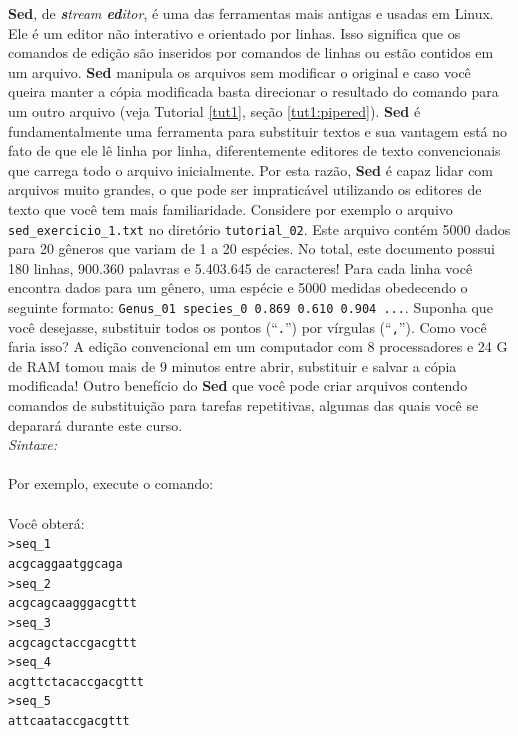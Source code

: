 \begin{refsection}
	\textbf{Sed}, de \textit{\textbf{s}tream \textbf{ed}itor}, é uma das ferramentas mais antigas e usadas em Linux. Ele é um editor não interativo e orientado por linhas. Isso significa que os comandos de edição são inseridos por comandos de linhas ou estão contidos em um arquivo. \textbf{Sed} manipula os arquivos sem modificar o original e caso você queira manter a cópia modificada basta direcionar o resultado do comando para um outro arquivo (veja Tutorial \ref{tut1}, seção \ref{tut1:pipered}). \textbf{Sed} é fundamentalmente uma ferramenta para substituir textos e sua vantagem está no fato de que ele lê linha por linha, diferentemente editores de texto convencionais que carrega todo o arquivo inicialmente. Por esta razão, \textbf{Sed} é capaz lidar com arquivos muito grandes, o que pode ser impraticável utilizando os editores de texto que você tem mais familiaridade. Considere por exemplo o arquivo \texttt{sed\_exercicio\_1.txt} no diretório \texttt{tutorial\_02}. Este arquivo contém 5000 dados para 20 gêneros que variam de 1 a 20 espécies. No total, este documento possui 180 linhas, 900.360 palavras e 5.403.645 de caracteres! Para cada linha você encontra dados para um gênero, uma espécie e 5000 medidas obedecendo o seguinte formato: \texttt{Genus\_01 species\_0	0.869	0.610	0.904	...}. Suponha que você desejasse, substituir todos os pontos (``\texttt{.}'') por vírgulas (``\texttt{,}''). Como você faria isso? A edição convencional em um computador com 8 processadores e 24 G de RAM tomou mais de 9 minutos entre abrir, substituir e salvar a cópia modificada! Outro benefício do \textbf{Sed} que você pode criar arquivos contendo comandos de substituição para tarefas repetitivas, algumas das quais você se deparará durante este curso.\\

\textit{Sintaxe:}\\
 \\

Por exemplo, execute o comando:\\
\\

Você obterá:\\
\texttt{>seq\_1}\\
\texttt{acgcaggaatggcaga}\\
\texttt{>seq\_2}\\
\texttt{acgcagcaagggacgttt}\\
\texttt{>seq\_3}\\
\texttt{acgcagctaccgacgttt}\\
\texttt{>seq\_4}\\
\texttt{acgttctacaccgacgttt}\\
\texttt{>seq\_5}\\
\texttt{attcaataccgacgttt}\\


\end{refsection}
